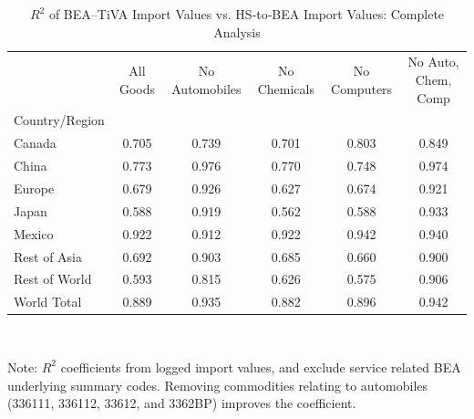 \begin{table}[htbp]
\centering
\caption{$R^2$ of BEA--TiVA Import Values vs. HS‐to‐BEA Import Values: Complete Analysis}
\label{correlation_coefficent_regions}
\begin{tabular}{lccccc}
\toprule
 & All Goods & No Automobiles & No Chemicals & No Computers & No Auto, Chem, Comp \\
Country/Region &  &  &  &  &  \\
\midrule
Canada & 0.705 & 0.739 & 0.701 & 0.803 & 0.849 \\
China & 0.773 & 0.976 & 0.770 & 0.748 & 0.974 \\
Europe & 0.679 & 0.926 & 0.627 & 0.674 & 0.921 \\
Japan & 0.588 & 0.919 & 0.562 & 0.588 & 0.933 \\
Mexico & 0.922 & 0.912 & 0.922 & 0.942 & 0.940 \\
Rest of Asia & 0.692 & 0.903 & 0.685 & 0.660 & 0.900 \\
Rest of World & 0.593 & 0.815 & 0.626 & 0.575 & 0.906 \\
World Total & 0.889 & 0.935 & 0.882 & 0.896 & 0.942 \\
\bottomrule
\end{tabular}
\vspace{0.01cm}\\
\raggedright
{\scriptsize Note: $R^2$ coefficients from logged import values, and exclude service related BEA underlying summary codes. Removing commodities relating to automobiles (336111, 336112, 33612, and 3362BP) improves the coefficient.}

\end{table}

